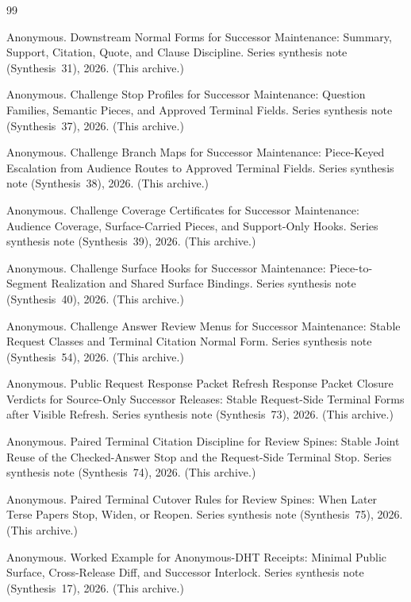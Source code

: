 \documentclass[11pt]{article}
\begin{document}
\begin{thebibliography}{99}\small

Anonymous.
\newblock Downstream Normal Forms for Successor Maintenance: Summary, Support, Citation, Quote, and Clause Discipline.
\newblock Series synthesis note (Synthesis~31), 2026. (This archive.)

Anonymous.
\newblock Challenge Stop Profiles for Successor Maintenance: Question Families, Semantic Pieces, and Approved Terminal Fields.
\newblock Series synthesis note (Synthesis~37), 2026. (This archive.)

Anonymous.
\newblock Challenge Branch Maps for Successor Maintenance: Piece-Keyed Escalation from Audience Routes to Approved Terminal Fields.
\newblock Series synthesis note (Synthesis~38), 2026. (This archive.)

Anonymous.
\newblock Challenge Coverage Certificates for Successor Maintenance: Audience Coverage, Surface-Carried Pieces, and Support-Only Hooks.
\newblock Series synthesis note (Synthesis~39), 2026. (This archive.)

Anonymous.
\newblock Challenge Surface Hooks for Successor Maintenance: Piece-to-Segment Realization and Shared Surface Bindings.
\newblock Series synthesis note (Synthesis~40), 2026. (This archive.)

Anonymous.
\newblock Challenge Answer Review Menus for Successor Maintenance: Stable Request Classes and Terminal Citation Normal Form.
\newblock Series synthesis note (Synthesis~54), 2026. (This archive.)

Anonymous.
\newblock Public Request Response Packet Refresh Response Packet Closure Verdicts for Source-Only Successor Releases: Stable Request-Side Terminal Forms after Visible Refresh.
\newblock Series synthesis note (Synthesis~73), 2026. (This archive.)

Anonymous.
\newblock Paired Terminal Citation Discipline for Review Spines: Stable Joint Reuse of the Checked-Answer Stop and the Request-Side Terminal Stop.
\newblock Series synthesis note (Synthesis~74), 2026. (This archive.)

Anonymous.
\newblock Paired Terminal Cutover Rules for Review Spines: When Later Terse Papers Stop, Widen, or Reopen.
\newblock Series synthesis note (Synthesis~75), 2026. (This archive.)

Anonymous.
\newblock Worked Example for Anonymous-DHT Receipts: Minimal Public Surface, Cross-Release Diff, and Successor Interlock.
\newblock Series synthesis note (Synthesis~17), 2026. (This archive.)

\end{thebibliography}
\end{document}
